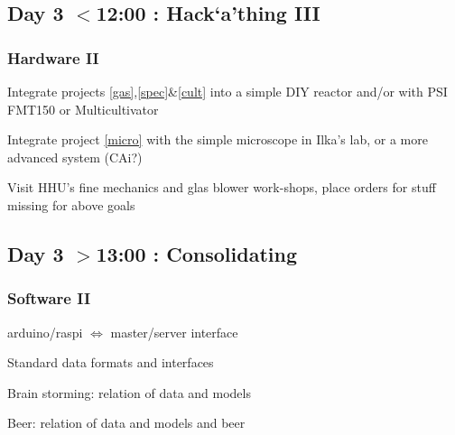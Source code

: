 \documentclass[12pt,a4paper]{scrartcl}
\begin{document}
\subsection{Day 3 $<$12:00 : Hack`a'thing III}

\subsubsection{Hardware II} 
Integrate projects \ref{gas},\ref{spec}\&\ref{cult} into a simple DIY
reactor and/or with PSI FMT150 or Multicultivator

Integrate project \ref{micro} with the simple microscope in Ilka's lab,
or a more advanced system (CAi?)

Visit HHU's fine mechanics and glas blower work-shops, place orders 
for stuff missing for above goals


\subsection{Day 3 $>$13:00 : Consolidating}

\subsubsection{Software II}
arduino/raspi $\Leftrightarrow$  master/server interface

Standard data formats and interfaces

Brain storming: relation of data and models

Beer: relation of data and models and beer
\end{document}
